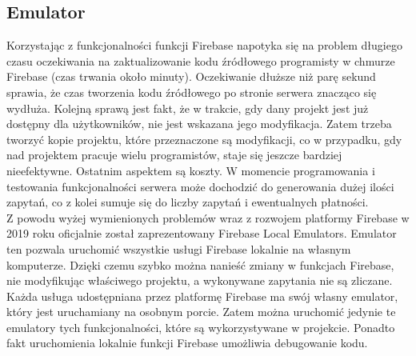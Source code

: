 \subsection{Emulator}

Korzystając z funkcjonalności funkcji Firebase napotyka się na problem długiego czasu oczekiwania na zaktualizowanie kodu źródłowego programisty w chmurze Firebase (czas trwania około minuty). Oczekiwanie dłuższe niż parę sekund sprawia, że czas tworzenia kodu źródłowego po stronie serwera znacząco się wydłuża. Kolejną sprawą jest fakt, że w trakcie, gdy dany projekt jest już dostępny dla użytkowników, nie jest wskazana jego modyfikacja. Zatem trzeba tworzyć kopie projektu, które przeznaczone są modyfikacji, co w przypadku, gdy nad projektem pracuje wielu programistów, staje się jeszcze bardziej nieefektywne. Ostatnim aspektem są koszty. W momencie programowania i testowania funkcjonalności serwera może dochodzić do generowania dużej ilości zapytań, co z kolei sumuje się do liczby zapytań i ewentualnych płatności. \\

Z powodu wyżej wymienionych problemów wraz z rozwojem platformy Firebase w 2019 roku oficjalnie został zaprezentowany Firebase Local Emulators. Emulator ten pozwala uruchomić wszystkie usługi Firebase lokalnie na własnym komputerze. Dzięki czemu szybko można nanieść zmiany w funkcjach Firebase, nie modyfikując właściwego projektu, a wykonywane zapytania nie są zliczane. \\

Każda usługa udostępniana przez platformę Firebase ma swój własny emulator, który jest uruchamiany na osobnym porcie. Zatem można uruchomić jedynie te emulatory tych funkcjonalności, które są wykorzystywane w projekcie. Ponadto fakt uruchomienia lokalnie funkcji Firebase  umożliwia debugowanie kodu.



